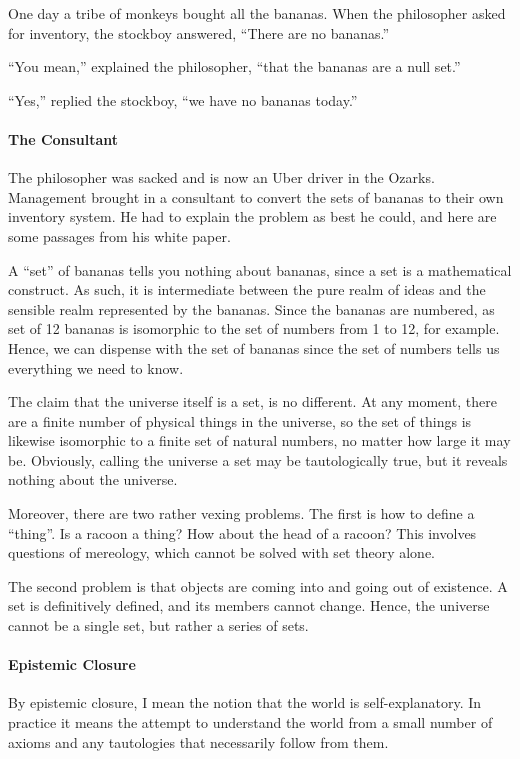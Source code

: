 One day a tribe of monkeys bought all the bananas. When the philosopher asked for inventory, the stockboy answered, ``There are no bananas.''

``You mean,'' explained the philosopher, ``that the bananas are a null set.''

``Yes,'' replied the stockboy, ``we have no bananas today.''

\paragraph{The Consultant}


The philosopher was sacked and is now an Uber driver in the Ozarks. Management brought in a consultant to convert the sets of bananas to their own inventory system. He had to explain the problem as best he could, and here are some passages from his white paper.

A ``set'' of bananas tells you nothing about bananas, since a set is a mathematical construct. As such, it is intermediate between the pure realm of ideas and the sensible realm represented by the bananas. Since the bananas are numbered, as set of 12 bananas is isomorphic to the set of numbers from 1 to 12, for example. Hence, we can dispense with the set of bananas since the set of numbers tells us everything we need to know.

The claim that the universe itself is a set, is no different. At any moment, there are a finite number of physical things in the universe, so the set of things is likewise isomorphic to a finite set of natural numbers, no matter how large it may be. Obviously, calling the universe a set may be tautologically true, but it reveals nothing about the universe.

Moreover, there are two rather vexing problems. The first is how to define a ``thing''. Is a racoon a thing? How about the head of a racoon? This involves questions of mereology, which cannot be solved with set theory alone.

The second problem is that objects are coming into and going out of existence. A set is definitively defined, and its members cannot change. Hence, the universe cannot be a single set, but rather a series of sets.

\paragraph{Epistemic Closure}


By epistemic closure, I mean the notion that the world is self-explanatory. In practice it means the attempt to understand the world from a small number of axioms and any tautologies that necessarily follow from them.

